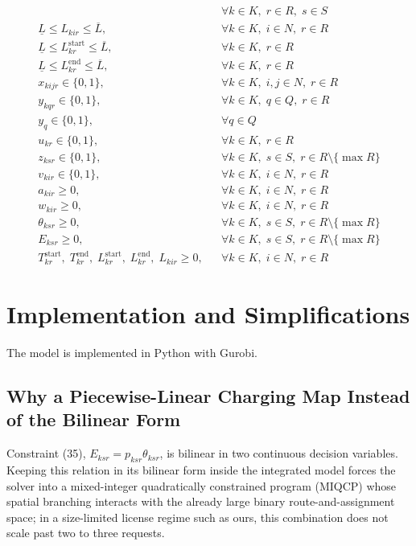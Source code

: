 \documentclass[11pt]{article}
\begin{document}
\begin{align}
&& \forall k\in K,\; r\in R,\; s\in S
\tag{37} \\
\underline{L}\le L_{kir} \le \overline{L},
&& \forall k\in K,\; i\in N,\; r\in R
\tag{38} \\
\underline{L}\le L^{\mathrm{start}}_{kr} \le \overline{L},
&& \forall k\in K,\; r\in R
\tag{39}\\
\underline{L}\le L^{\mathrm{end}}_{kr} \le \overline{L},
&& \forall k\in K,\; r\in R
\tag{40} \\
x_{kijr}\in \{0,1\},
&& \forall k\in K,\; i,j\in N,\; r\in R
\tag{41}\\
y_{kqr}\in \{0,1\},
&& \forall k\in K,\; q\in Q,\; r\in R
\tag{42}\\
y_q\in \{0,1\},
&& \forall q\in Q
\tag{43}\\
u_{kr}\in \{0,1\},
&& \forall k\in K,\; r\in R
\tag{44}\\
z_{ksr}\in \{0,1\},
&& \forall k\in K,\; s\in S,\; r\in R\setminus\{\max R\}
\tag{45} \\
v_{kir}\in \{0,1\},
&& \forall k\in K,\; i\in N,\; r\in R
\tag{46} \\
a_{kir}\ge 0,
&& \forall k\in K,\; i\in N,\; r\in R
\tag{47}\\
w_{kir}\ge 0,
&& \forall k\in K,\; i\in N,\; r\in R
\tag{48}\\
\theta_{ksr}\ge 0,
&& \forall k\in K,\; s\in S,\; r\in R\setminus\{\max R\}
\tag{49}\\
E_{ksr}\ge 0,
&& \forall k\in K,\; s\in S,\; r\in R\setminus\{\max R\}
\tag{50}\\
T^{\mathrm{start}}_{kr},\; T^{\mathrm{end}}_{kr},\; L^{\mathrm{start}}_{kr},\; L^{\mathrm{end}}_{kr},\; L_{kir} \ge 0,
&& \forall k\in K,\; i\in N,\; r\in R
\tag{51}
\end{align}

\section{Implementation and Simplifications}

The model is implemented in Python with Gurobi.

\subsection{Why a Piecewise-Linear Charging Map Instead of the Bilinear Form}

Constraint (35), \(E_{ksr}=p_{ksr}\theta_{ksr}\), is bilinear in two continuous decision variables. Keeping this relation in its bilinear form inside the integrated model forces the solver into a mixed-integer quadratically constrained program (MIQCP) whose spatial branching interacts with the already large binary route-and-assignment space; in a size-limited license regime such as ours, this combination does not scale past two to three requests.
\end{document}
